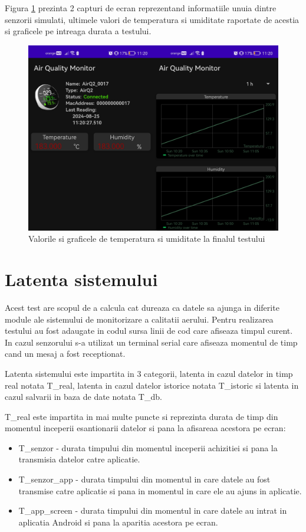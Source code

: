 Figura \ref{fig:tv_scalability_sensor_chart_view} prezinta 2 capturi de ecran reprezentand informatiile unuia dintre senzorii simulati, ultimele valori de temperatura 
si umiditate raportate de acestia si graficele pe intreaga durata a testului.
\begin{figure}[H]
    \centering
    \includegraphics[scale=0.18]{figs/tv_scalability_sensor_chart_view.png}
    \caption{Valorile si graficele de temperatura si umiditate la finalul testului}
    \label{fig:tv_scalability_sensor_chart_view}
\end{figure}

\section{Latenta sistemului}\label{sec:tv_latecy}
Acest test are scopul de a calcula cat dureaza ca datele sa ajunga in diferite module ale sistemului de monitorizare a calitatii aerului. Pentru realizarea testului au 
fost adaugate in codul sursa linii de cod care afiseaza timpul curent. In cazul senzorului s-a utilizat un terminal serial care afiseaza momentul de timp cand un mesaj a 
fost receptionat.

Latenta sistemului este impartita in 3 categorii, latenta in cazul datelor in timp real notata T\_real, latenta in cazul datelor istorice notata T\_istoric si 
latenta in cazul salvarii in baza de date notata T\_db.

T\_real este impartita in mai multe puncte si reprezinta durata de timp din momentul inceperii esantionarii datelor si pana la afisareaa acestora pe ecran:
\begin{itemize}
	\item T\_senzor - durata timpului din momentul inceperii achizitiei si pana la transmisia datelor catre aplicatie.
	\item T\_senzor\_app - durata timpului din momentul in care datele au fost transmise catre aplicatie si pana in momentul in care ele au ajuns in aplicatie.
	\item T\_app\_screen - durata timpului din momentul in care datele au intrat in aplicatia Android si pana la aparitia acestora pe ecran.
\end{itemize}

